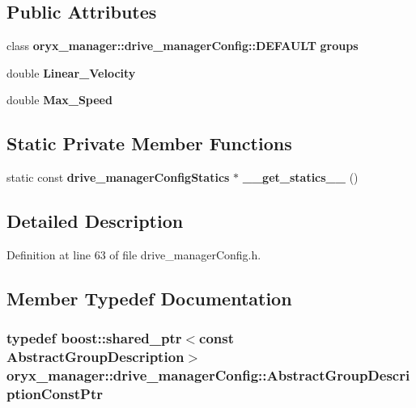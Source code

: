 \subsection*{\-Public \-Attributes}
\begin{DoxyCompactItemize}
\item 
class \*
{\bf oryx\-\_\-manager\-::drive\-\_\-manager\-Config\-::\-D\-E\-F\-A\-U\-L\-T} {\bf groups}
\item 
double {\bf \-Linear\-\_\-\-Velocity}
\item 
double {\bf \-Max\-\_\-\-Speed}
\end{DoxyCompactItemize}
\subsection*{\-Static \-Private \-Member \-Functions}
\begin{DoxyCompactItemize}
\item 
static const \*
{\bf drive\-\_\-manager\-Config\-Statics} $\ast$ {\bf \-\_\-\-\_\-get\-\_\-statics\-\_\-\-\_\-} ()
\end{DoxyCompactItemize}


\subsection{\-Detailed \-Description}


\-Definition at line 63 of file drive\-\_\-manager\-Config.\-h.



\subsection{\-Member \-Typedef \-Documentation}
\subsubsection[{\-Abstract\-Group\-Description\-Const\-Ptr}]{\setlength{\rightskip}{0pt plus 5cm}typedef boost\-::shared\-\_\-ptr$<$const {\bf \-Abstract\-Group\-Description}$>$ {\bf oryx\-\_\-manager\-::drive\-\_\-manager\-Config\-::\-Abstract\-Group\-Description\-Const\-Ptr}}\label{classoryx__manager_1_1drive__managerConfig_aa7639faacafdb0f08833f9e767022af0}


